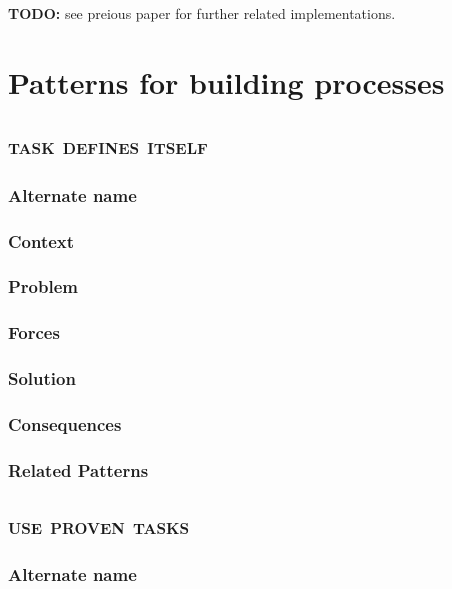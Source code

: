 \documentclass[prodmode]{style/acmlarge}
\begin{document}
\textbf{TODO:} see preious paper for further related implementations.



\section{Patterns for building processes}


\subsection{\textsc{\textbf{task defines itself}}}

\subsubsection*{Alternate name}

\subsubsection*{Context}

\subsubsection*{Problem}

\subsubsection*{Forces}

\subsubsection*{Solution}

\subsubsection*{Consequences}

\subsubsection*{Related Patterns}



\subsection{\textsc{\textbf{use proven tasks}}}

\subsubsection*{Alternate name}
\end{document}
